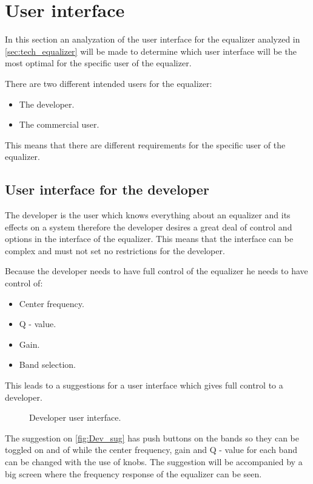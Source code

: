 \section{User interface} \label{sec:user_interface}
In this section an analyzation of the user interface for the equalizer analyzed in \autoref{sec:tech_equalizer} will be made to determine which user interface will be the most optimal for the specific user of the equalizer. 

There are two different intended users for the equalizer: 
\begin{itemize}
\item The developer.
\item The commercial user.
\end{itemize}
This means that there are different requirements for the specific user of the equalizer.

\subsection*{User interface for the developer}
The developer is the user which knows everything about an equalizer and its effects on a system therefore the developer desires a great deal of control and options in the interface of the equalizer. This means that the interface can be complex and must not set no restrictions for the developer.  

Because the developer needs to have full control of the equalizer he needs to have control of: 
\begin{itemize}
\item Center frequency.
\item Q - value.
\item Gain.
\item Band selection.
\end{itemize} 
This leads to a suggestions for a user interface which gives full control to a developer.

\begin{figure}[H]
\centering
{}

\caption{Developer user interface.}
\label{fig:Dev_sug}
\end{figure}

The suggestion on \autoref{fig:Dev_sug} has push buttons on the bands so they can be toggled on and of while the center frequency, gain and Q - value for each band can be changed with the use of knobs. The suggestion will be accompanied by a big screen where the frequency response of the equalizer can be seen. 

